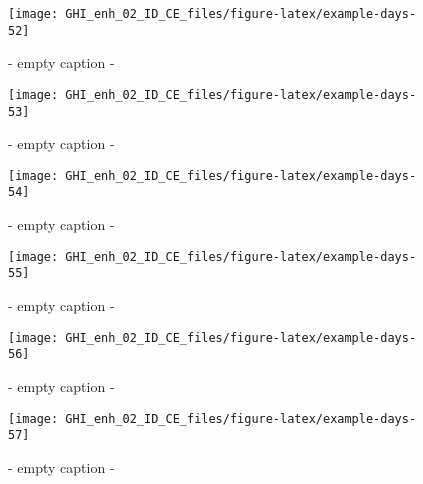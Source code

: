 \documentclass[
  10pt,
  a4paper,oneside]{article}
\begin{document}
\begin{figure}[H]

{\centering \texttt{[image: GHI\_enh\_02\_ID\_CE\_files/figure-latex/example-days-52]} 

}

\caption{ - empty caption - }\label{fig:example-days-52}
\end{figure}

\begin{figure}[H]

{\centering \texttt{[image: GHI\_enh\_02\_ID\_CE\_files/figure-latex/example-days-53]} 

}

\caption{ - empty caption - }\label{fig:example-days-53}
\end{figure}

\begin{figure}[H]

{\centering \texttt{[image: GHI\_enh\_02\_ID\_CE\_files/figure-latex/example-days-54]} 

}

\caption{ - empty caption - }\label{fig:example-days-54}
\end{figure}

\begin{figure}[H]

{\centering \texttt{[image: GHI\_enh\_02\_ID\_CE\_files/figure-latex/example-days-55]} 

}

\caption{ - empty caption - }\label{fig:example-days-55}
\end{figure}

\begin{figure}[H]

{\centering \texttt{[image: GHI\_enh\_02\_ID\_CE\_files/figure-latex/example-days-56]} 

}

\caption{ - empty caption - }\label{fig:example-days-56}
\end{figure}

\begin{figure}[H]

{\centering \texttt{[image: GHI\_enh\_02\_ID\_CE\_files/figure-latex/example-days-57]} 

}

\caption{ - empty caption - }\label{fig:example-days-57}
\end{figure}
\end{document}
